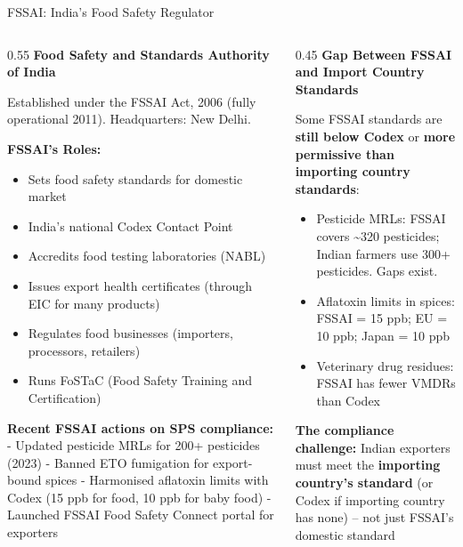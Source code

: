 \documentclass[
  ignorenonframetext,
  aspectratio=169,
]{beamer}
\makeatletter
\providecommand{\tightlist}{%
  \setlength{\itemsep}{0pt}\setlength{\parskip}{0pt}}
\let\quarto@originallabel\label
\DeclareRobustCommand*{\label}[1]{\quarto@originallabel{#1}}
\makeatother
\begin{document}
\begin{frame}{FSSAI: India's Food Safety Regulator}
\label{fssai-indias-food-safety-regulator}
\begin{columns}[T]
\begin{column}{0.55\linewidth}
\textbf{Food Safety and Standards Authority of India}

Established under the FSSAI Act, 2006 (fully operational 2011).
Headquarters: New Delhi.

\textbf{FSSAI's Roles:}

\begin{itemize}
\tightlist
\item
  Sets food safety standards for domestic market
\item
  India's national Codex Contact Point
\item
  Accredits food testing laboratories (NABL)
\item
  Issues export health certificates (through EIC for many products)
\item
  Regulates food businesses (importers, processors, retailers)
\item
  Runs FoSTaC (Food Safety Training and Certification)
\end{itemize}

\textbf{Recent FSSAI actions on SPS compliance:} - Updated pesticide
MRLs for 200+ pesticides (2023) - Banned ETO fumigation for export-bound
spices - Harmonised aflatoxin limits with Codex (15 ppb for food, 10 ppb
for baby food) - Launched FSSAI Food Safety Connect portal for exporters
\end{column}

\begin{column}{0.45\linewidth}
\textbf{Gap Between FSSAI and Import Country Standards}

Some FSSAI standards are \textbf{still below Codex} or \textbf{more
permissive than importing country standards}:

\begin{itemize}
\tightlist
\item
  Pesticide MRLs: FSSAI covers \textasciitilde320 pesticides; Indian
  farmers use 300+ pesticides. Gaps exist.
\item
  Aflatoxin limits in spices: FSSAI = 15 ppb; EU = 10 ppb; Japan = 10
  ppb
\item
  Veterinary drug residues: FSSAI has fewer VMDRs than Codex
\end{itemize}

\textbf{The compliance challenge:} Indian exporters must meet the
\textbf{importing country's standard} (or Codex if importing country has
none) -- not just FSSAI's domestic standard
\end{column}
\end{columns}
\end{frame}
\end{document}
